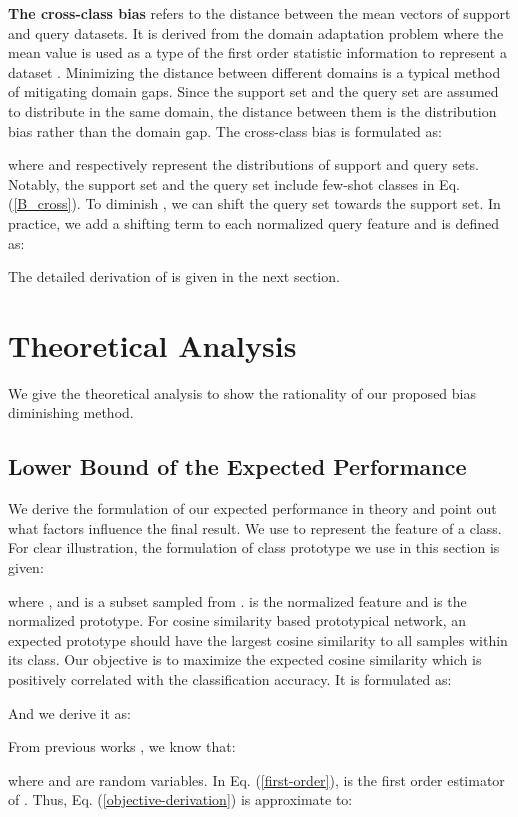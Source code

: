 \documentclass[runningheads]{llncs}
\begin{document}
\textbf{The cross-class bias} refers to the distance between the mean vectors of support and query datasets. It is derived from the domain adaptation problem where the mean value is used as a type of the first order statistic information to represent a dataset \cite{wang2017deep}. Minimizing the distance between different domains is a typical method of mitigating domain gaps. Since the support set and the query set are assumed to distribute in the same domain, the distance between them is the distribution bias rather than the domain gap. The cross-class bias  is formulated as:

where  and  respectively represent the distributions of support and query sets. Notably, the support set  and the query set  include  few-shot classes in Eq. (\ref{B_cross}). 
To diminish , we can shift the query set towards the support set. In practice, we add a shifting term  to each normalized query feature  and  is defined as:

The detailed derivation of  is given in the next section.


\section{Theoretical Analysis}
\label{theory-analysis}
We give the theoretical analysis to show the rationality of our proposed bias diminishing method.
\subsection{Lower Bound of the Expected Performance}
We derive the formulation of our expected performance in theory and point out what factors influence the final result. 
We use  to represent the feature of a class. For clear illustration, the formulation of class prototype we use in this section is given: 

where ,  and  is a subset sampled from .  is the normalized feature and  is the normalized prototype.
For cosine similarity based prototypical network, an expected prototype should have the largest cosine similarity to all samples within its class. Our objective is to maximize the expected cosine similarity which is positively correlated with the classification accuracy. It is formulated as:

And we derive it as:

From previous works \cite{nowozin2014optimal,rice2015the}, we know that:

where  and  are random variables. In Eq. (\ref{first-order}),  is the first order estimator of . Thus, Eq. (\ref{objective-derivation}) is approximate to:
\end{document}
